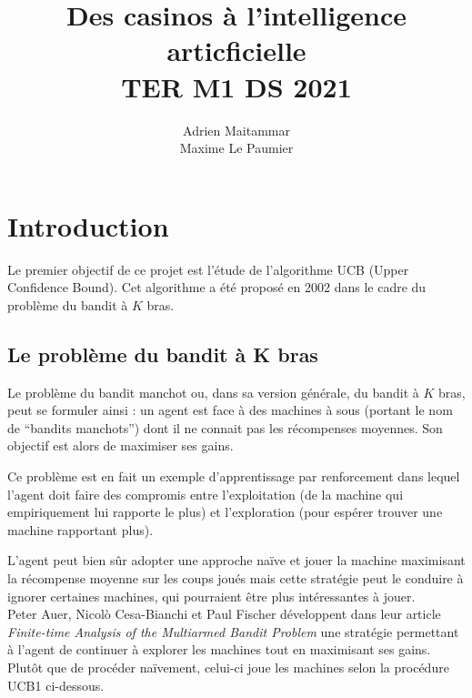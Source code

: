 \documentclass[a4paper]{article}
\title{\huge Des casinos à l'intelligence articficielle\\[15pt] \small TER M1 DS 2021}
\author{Adrien Maitammar \\ Maxime Le Paumier}
\theoremstyle{definition}
\begin{document}
\maketitle

\vspace{30pt}

\renewcommand{\contentsname}{Sommaire}
\tableofcontents
 \clearpage
 
 
\section{Introduction}

\vspace{5pt}

Le premier objectif de ce projet est l'étude de l'algorithme UCB (Upper Confidence Bound). Cet algorithme a été proposé en 2002 dans le cadre du problème du bandit à $K$ bras.

\subsection{Le problème du bandit à K bras}

Le problème du bandit manchot ou, dans sa version générale, du bandit à $K$ bras, peut se formuler ainsi : un agent est face à des machines à sous (portant le nom de ``bandits manchots'') dont il ne connait pas les récompenses moyennes. Son objectif est alors de maximiser ses gains.

Ce problème est en fait un exemple d'apprentissage par renforcement dans lequel l'agent doit faire des compromis entre l'exploitation (de la machine qui empiriquement lui rapporte le plus) et l'exploration (pour espérer trouver une machine rapportant plus).

L'agent peut bien sûr adopter une approche naïve et jouer la machine maximisant la récompense moyenne sur les coups joués mais  cette stratégie peut le conduire à ignorer certaines machines, qui pourraient être plus intéressantes à jouer. \\
 
Peter Auer, Nicol\`o Cesa-Bianchi et Paul Fischer développent dans leur article \textit{Finite-time Analysis of the Multiarmed Bandit
Problem} une stratégie permettant à l'agent de continuer à explorer les machines tout en maximisant ses gains. Plutôt que de procéder naïvement, celui-ci joue les machines selon la procédure UCB1 ci-dessous.

\vspace{10pt}
\end{document}
